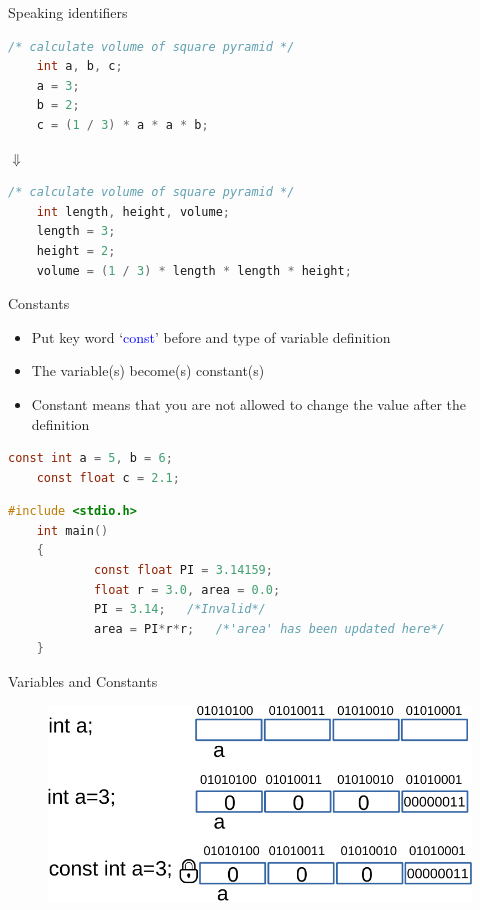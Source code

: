 \begin{frame}[fragile]{Speaking identifiers}
	\begin{lstlisting}[language=c]
	/* calculate volume of square pyramid */
	int a, b, c;
	a = 3;
	b = 2;
	c = (1 / 3) * a * a * b;
	\end{lstlisting}
	\centering
	$\Downarrow$
	\begin{lstlisting}[language=c]
	/* calculate volume of square pyramid */
	int length, height, volume;
	length = 3;
	height = 2;
	volume = (1 / 3) * length * length * height;
	\end{lstlisting}
\end{frame}

\begin{frame}[fragile]{Constants}
	\begin{itemize}
		\item {Put key word `\textcolor{blue}{const}' before and type of variable definition}
		\item {The variable(s) become(s) constant(s)}
		\item {Constant means that you are not allowed to change the value after the definition}
	\end{itemize}
	\begin{lstlisting}[language=c, frame=none, numbers=none]
	const int a = 5, b = 6;
	const float c = 2.1;
	\end{lstlisting}
	\begin{lstlisting}[language=c]
	#include <stdio.h>
	int main()
	{
	    	const float PI = 3.14159;
	    	float r = 3.0, area = 0.0;
	    	PI = 3.14;   /*Invalid*/
	    	area = PI*r*r;   /*'area' has been updated here*/
	}
	\end{lstlisting}
	
\end{frame}

\begin{frame}[fragile]{Variables and Constants}
\begin{figure}
	\begin{center}
		\includegraphics[width=0.8\linewidth]{figs/assign.pdf}
	\end{center}
\end{figure}
	
\end{frame}
